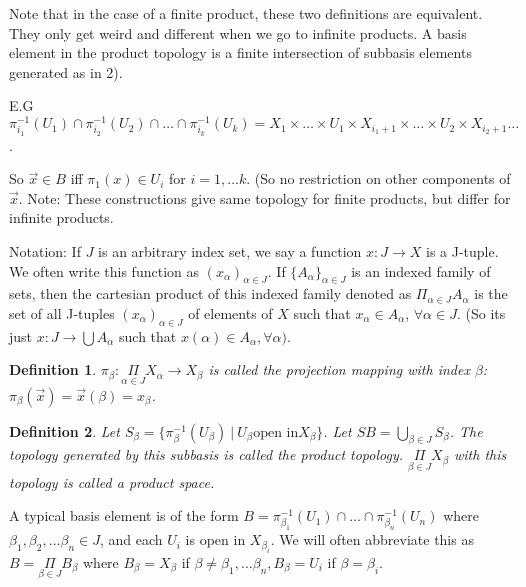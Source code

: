 \documentclass[11pt]{article}
\newtheorem{definition}{Definition}[section]
\begin{document}
Note that in the case of a finite product, these two definitions are
equivalent. They only get weird and different when we go to infinite
products. A basis element in the product topology is a finite
intersection of subbasis elements generated as in 2). 

E.G \(\pi_{i_1}^{-1}(U_1)\cap \pi_{i_2}^{-1}(U_2)\cap\ldots\cap
\pi_{i_k}^{-1}(U_k) = X_1\times\ldots\times U_1\times
X_{i_1+1}\times\ldots\times U_2\times X_{i_2 + 1}\ldots\).

So \(\vec{x}\in B\) iff \(\pi_1(x)\in U_i\) for \(i = 1, \ldots k\). (So no
restriction on other components of \(\vec{x}\). Note: These
constructions give same topology for finite products, but differ for
infinite products. 

Notation: If \(J\) is an arbitrary index set, we say a function
\(x:J\rightarrow X\) is a J-tuple. We often write this function as
\((x_{\alpha})_{\alpha \in J}\). If \(\{A_{\alpha}\}_{\alpha \in J}\) is
an indexed family of sets, then the cartesian product of this indexed
family denoted as \(\Pi_{\alpha \in J}A_{\alpha}\) is the set of all
J-tuples \((x_{\alpha})_{\alpha \in J}\) of elements of \(X\) such that
\(x_{\alpha}\in A_{\alpha}\), \(\forall \alpha \in J\). (So its just \(x:
J\rightarrow \bigcup A_{\alpha}\) such that \(x(\alpha)\in A_{\alpha},
\forall\alpha)\).

\begin{definition}
\(\pi_{\beta}: \Pi\limits_{\alpha\in J}X_{\alpha}\rightarrow X_{\beta}\)
is called the projection mapping with index \(\beta\):
\(\pi_{\beta}(\vec{x}) = \vec{x}(\beta) = x_{\beta}\). 
\end{definition}

\begin{definition}
Let \(S_{\beta} = \{ \pi_{\beta}^{-1}(U_{\beta})\ |\ U_{\beta}
\text{open in} X_{\beta}\}\). Let \(SB = \bigcup\limits_{\beta \in
J}S_{\beta}\). The topology generated by this subbasis is called the
product topology. \(\Pi\limits_{\beta \in J} X_{\beta}\) with this
topology is called a product space.
\end{definition}

A typical basis element is of the form \(B =
\pi^{-1}_{\beta_1}(U_1)\cap\ldots\cap\pi^{-1}_{\beta_n}(U_n)\) where
\(\beta_1, \beta_2, \ldots \beta_n \in J\), and each \(U_i\) is open in
\(X_{\beta_i}\). We will often abbreviate this as \(B = \Pi\limits_{\beta
\in J}B_{\beta}\) where \(B_{\beta} = X_{\beta}\) if \(\beta\not =
\beta_1,\ldots\beta_n, B_{\beta} = U_i\) if \(\beta = \beta_i\).
\end{document}
